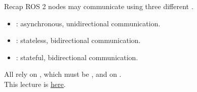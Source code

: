 
\begin{frame}{Recap}
  ROS 2 nodes may communicate using three different .
  \begin{itemize}
    \item {}: asynchronous, unidirectional communication.
    \item {}: stateless, bidirectional communication.
    \item {}: stateful, bidirectional communication.
  \end{itemize}
  \smallskip
  All rely on , which must be , and on .\\
  \bigskip
  This lecture is \href{https://github.com/robmasocco/DAFN25_Robotics_5}{\color{blue}\underline{here}}.
\end{frame}

